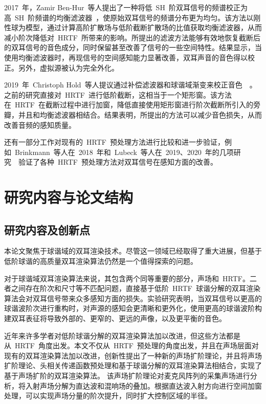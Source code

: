 2017~年，Zamir Ben-Hur~等人提出了一种将低~SH~阶双耳信号的频谱校正为高~SH~阶频谱的均衡滤波器~，使原始双耳信号的频谱分布更为均匀。该方法以刚性球为模型，通过计算高阶扩散场与低阶截断扩散场的比值获取均衡滤波器，从而减小阶次降低对~HRTF~所带来的影响。所提出的滤波方法能够有效地恢复截断后的双耳信号的音色成分，同时保留甚至改善了信号的一些空间特性。结果显示，当使用均衡滤波器时，再现信号的空间感知能力显著改善，双耳声音的音色得以校正。另外，虚拟源被认为完全外化。


2019~年~Christoph Hold~等人提议通过补偿滤波器和球谐域渐变来校正音色~~。之前的研究直接对~HRTF~进行低阶截断，这相当于一个矩形窗。该方法在~HRTF~在截断过程中进行加窗，降低直接使用矩形窗进行阶次截断所引入的旁瓣，并且和均衡滤波器相结合。结果表明，所提出的方法可以减少音色损失，从而改善音频的感知质量。

还有一部分工作对现有的~HRTF~预处理方法进行比较和进一步验证，例如~Brinkmann~等人在~2018~年和~Lubeck~等人在~2019、2020~年的几项研究~~验证了各种~HRTF~预处理方法对双耳信号在感知方面的改善。





\section{研究内容与论文结构}

\subsection{研究内容及创新点}

本论文聚焦于球谐域的双耳渲染技术。尽管这一领域已经取得了重大进展，但基于低阶球谐的高质量双耳渲染算法仍然是一个值得探索的问题。

对于球谐域双耳渲染算法来说，其包含两个同等重要的部分，声场和~HRTF。二者之间存在阶次和尺寸等不匹配问题，直接基于低阶~HRTF~球谐分解的双耳渲染算法会对双耳信号带来众多感知方面的损失。实验研究表明，当双耳信号以更高的球谐波阶次进行重构时，对声源的感知会更清晰和更外化，使用更高的球谐波阶构建双耳表征将导致外部的、更窄的、更远的声像，以及更平衡的音色。

近年来许多学者对低阶球谐分解的双耳渲染算法加以改进，但这些方法都是从~HRTF~角度出发。本文不仅从~HRTF~预处理的角度出发，并且在声场层面对现有的双耳渲染算法加以改进，创新性提出了一种新的声场扩阶理论，并且将声场扩阶理论、头相关传递函数预处理和基于球谐分解的双耳渲染算法相结合，实现了基于声场扩阶的双耳渲染算法。 该声场扩阶理论对麦克风阵列的采集声场进行分析，将入射声场分解为直达波和混响场的叠加。根据直达波入射方向进行空间加窗处理，可以实现声场分量的阶次提升，同时扩大控制区域的半径。


